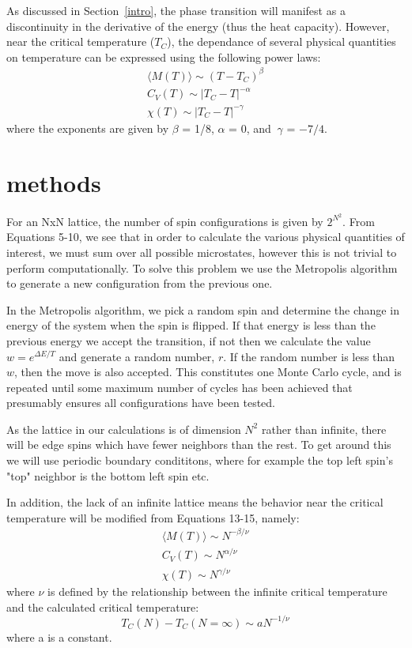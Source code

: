 \documentclass[prc,amsmath,twocolumn,superscriptaddress]{revtex4}
\begin{document}
As discussed in Section~\ref{intro}, the phase transition will manifest as a discontinuity in the derivative of the energy (thus the heat capacity). However, near the critical temperature ($T_C$), the dependance of several physical quantities on temperature can be expressed using the following power laws:
\begin{gather}
\langle M(T) \rangle \sim (T-T_C)^\beta \\
C_V(T)\sim |T_C -T|^{-\alpha} \\
\chi(T) \sim |T_C-T|^{-\gamma}
\end{gather}
where the exponents are given by $\beta$ = 1/8, $\alpha$ = 0, and $~\gamma$ = $-7/4$.
\section{methods}
\label{methods}
For an NxN lattice, the number of spin configurations is given by $2^{N^2}$. From Equations 5-10, we see that in order to calculate the various physical quantities of interest, we must sum over all possible microstates, however this is not trivial to perform computationally. To solve this problem we use the Metropolis algorithm~\cite{met} to generate a new configuration from the previous one. 

In the Metropolis algorithm, we pick a random spin and determine the change in energy of the system when the spin is flipped. If that energy is less than the previous energy we accept the transition, if not then we calculate the value $w=e^{\Delta E/T}$ and generate a random number, $r$. If the random number is less than $w$, then the move is also accepted. This constitutes one Monte Carlo cycle, and is repeated until some maximum number of cycles has been achieved  that presumably ensures all configurations have been tested.

As the lattice in our calculations is of dimension $N^2$ rather than infinite, there will be edge spins which have fewer neighbors than the rest. To get around this we will use periodic boundary condititons, where for example the top left spin's "top" neighbor is the bottom left spin etc.

In addition, the lack of an infinite lattice means the behavior near the critical temperature will be modified from Equations 13-15, namely:
\begin{gather}
\langle M(T) \rangle \sim N^{-\beta/\nu} \\
C_V(T)\sim N^{\alpha/\nu} \\
\chi(T) \sim N^{\gamma/\nu}
\end{gather}
where $\nu$ is defined by the relationship between the infinite critical temperature and the calculated critical temperature:
\begin{equation}
T_C(N)-T_C(N=\infty) \sim aN^{-1/\nu}
\end{equation}
where a is a constant.
\end{document}
